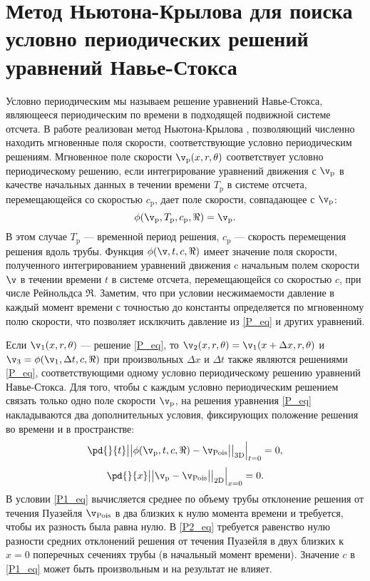 \section{Метод Ньютона-Крылова для поиска условно периодических решений уравнений Навье-Стокса}

Условно периодическим мы называем решение уравнений Навье-Стокса, являющееся периодическим по времени в подходящей подвижной системе отсчета. В работе реализован метод Ньютона-Крылова \cite{Sanchez2004, Viswanath2007, Dijkstra2014}, позволяющий численно находить мгновенные поля скорости, соответствующие условно периодическим решениям. Мгновенное поле скорости  $\v_\mathrm{p}(x,r,\theta)$ соответствует условно периодическому решению, если интегрирование уравнений движения с $\v_\mathrm{p}$ в качестве начальных данных в течении времени $T_\mathrm{p}$ в системе отсчета, перемещающейся со скоростью $c_\mathrm{p}$, дает поле скорости, совпадающее с $\v_\mathrm{p}$:
\begin{equation}\label{P_eq}
\phi(\v_\mathrm{p}, T_\mathrm{p}, c_\mathrm{p}, \Re) = \v_\mathrm{p}.
\end{equation}
В этом случае $T_\mathrm{p}$  --- временной период решения, $c_\mathrm{p}$ --- скорость перемещения решения вдоль трубы. Функция $\phi(\v, t, c, \Re)$ имеет значение поля скорости, полученного интегрированием уравнений движения c начальным полем скорости $\v$ в течении времени $t$ в системе отсчета, перемещающейся со скоростью $c$, при числе Рейнольдса $\Re$. Заметим, что при условии несжимаемости давление в каждый момент времени с точностью до константы определяется по мгновенному полю скорости, что позволяет исключить давление из \eqref{P_eq} и других уравнений. 

Если $\v_1(x,r,\theta)$ --- решение \eqref{P_eq}, то $\v_2(x, r, \theta) = \v_1(x + \Delta x, r, \theta)$ и $\v_3 = \phi(\v_1, \Delta t, c, \Re)$ при произвольных $\Delta x$ и $\Delta t$ также являются решениями \eqref{P_eq}, соответствующими одному условно периодическому решению уравнений Навье-Стокса. Для того, чтобы с каждым условно периодическим решением связать только одно поле скорости $\v_\mathrm{p}$, на решения уравнения \eqref{P_eq} накладываются два дополнительных условия, фиксирующих положение решения во времени и в пространстве:
\begin{equation} \label{P1_eq}
\pd{}{t} \big|\big| \phi(\v_\mathrm{p}, t, c, \Re) - \v_\mathrm{Pois} \big|\big|_\mathrm{3D} \Big|_{t=0} = 0,
\end{equation}
\begin{equation} \label{P2_eq}
\pd{}{x} \big|\big| \v_\mathrm{p} - \v_\mathrm{Pois} \big|\big|_\mathrm{2D} \Big|_{x = 0} = 0. 
\end{equation}
В условии \eqref{P1_eq} вычисляется среднее по объему трубы отклонение решения от течения Пуазейля $\v_{\mathrm{Pois}}$ в два близких к нулю момента времени и требуется, чтобы их разность была равна нулю. В \eqref{P2_eq} требуется равенство нулю разности средних отклонений решения от течения Пуазейля в двух близких к $x=0$ поперечных сечениях трубы (в начальный момент времени). Значение $c$ в \eqref{P1_eq} может быть произвольным и на результат не влияет. 


